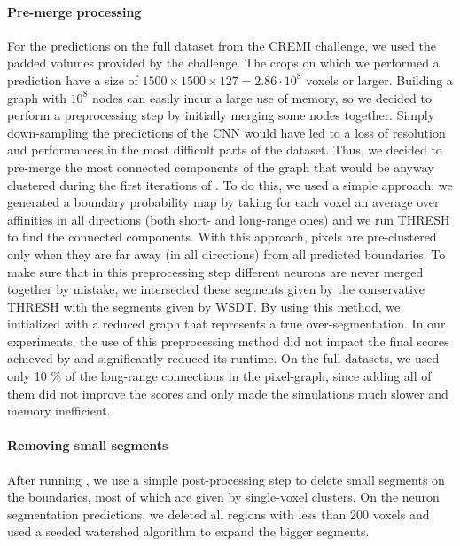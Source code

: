  \paragraph{Pre-merge processing} For the predictions on the full dataset from the CREMI challenge, we used  the padded volumes provided by the challenge. The crops on which we performed a prediction have a size of $1500\times1500\times127=2.86\cdot 10^8$ voxels or larger. Building a graph with $10^8$ nodes can easily incur a large use of memory, so we decided to perform a preprocessing step by initially merging some nodes together. Simply down-sampling the predictions of the CNN would have led to a loss of resolution and performances in the most difficult parts of the dataset. Thus, we decided to pre-merge the most connected components of the graph that would be anyway clustered during the first iterations of \algname{}. To do this, we used a simple approach: we generated a boundary probability map by taking for each voxel an average over affinities in all directions (both short- and long-range ones) and we run THRESH to find the connected components. With this approach, pixels are pre-clustered only when they are far away (in all directions) from all predicted boundaries. 
 To make sure that in this preprocessing step different neurons are never merged together by mistake, we intersected these segments given by the conservative THRESH with the segments given by WSDT. %
 By using this method, we initialized \algname{} with a reduced graph that represents a true over-segmentation. In our experiments, the use of this preprocessing method did not impact the final scores achieved by \algname{} and significantly reduced its runtime. On the full datasets, we used only 10 \% of the long-range connections in the pixel-graph, since adding all of them did not improve the scores and only made the simulations much slower and memory inefficient. 
 
 \paragraph{Removing small segments} After running \algname{}, we use a simple post-processing step to delete small segments on the boundaries, most of which are given by single-voxel clusters. On the neuron segmentation predictions, we deleted all regions with less than 200 voxels and used a seeded watershed algorithm to expand the bigger segments.

